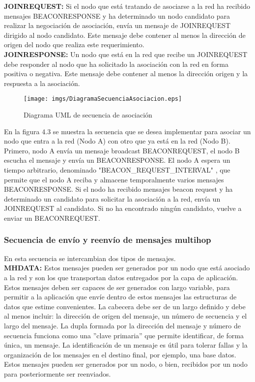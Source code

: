  \textbf{JOIN\textunderscore REQUEST:} Si el nodo que está tratando de asociarse a la red ha recibido mensajes BEACON\textunderscore RESPONSE y ha determinado un nodo candidato para realizar la negociación de asociación, envía un mensaje de JOIN\textunderscore REQUEST dirigido al nodo candidato. Este mensaje debe contener al menos la dirección de origen del nodo que realiza este requerimiento.\\
 
 \textbf{JOIN\textunderscore RESPONSE:} Un nodo que está en la red que recibe un JOIN\textunderscore REQUEST debe responder al nodo que ha solicitado la asociación con la red en forma positiva o negativa. Este mensaje debe contener al menos la dirección origen y la respuesta a la asociación.\\
 
\begin{figure}[H]
 \centering
 \texttt{[image: imgs/DiagramaSecuenciaAsociacion.eps]}
 \caption{Diagrama UML de secuencia de asociación}
\end{figure}

En la figura 4.3 se muestra la secuencia que se desea implementar para asociar un nodo que entra a la red (Nodo A) con otro que ya está en la red (Nodo B). Primero, nodo A envía un mensaje broadcast BEACON\textunderscore REQUEST, el nodo B escucha el mensaje y envía un BEACON\textunderscore RESPONSE. El nodo A espera un tiempo arbitrario, denominado "BEACON\_REQUEST\_INTERVAL" , que permite que el nodo A reciba y almacene temporalmente varios mensajes BEACON\textunderscore RESPONSE. Si el nodo ha recibido mensajes beacon request y ha determinado un candidato para solicitar la asociación a la red, envía un JOIN\textunderscore REQUEST al candidato. Si no ha encontrado ningún candidato, vuelve a enviar un BEACON\textunderscore REQUEST.

\subsubsection{Secuencia de envío y reenvío de mensajes multihop}
En esta secuencia se intercambian dos tipos de mensajes.\\

\textbf{MH\textunderscore DATA:} Estos mensajes pueden ser generados por un nodo que está asociado a la red y son los que transportan datos entregados por la capa de aplicación. Estos mensajes deben ser capaces de ser generados con largo variable, para permitir a la aplicación que envíe dentro de estos mensajes las estructuras de datos que estime convenientes. La cabecera debe ser de un largo definido y debe al menos incluir: la dirección de origen del mensaje, un número de secuencia y el largo del mensaje. La dupla formada por la dirección del mensaje y número de secuencia funciona como una ''clave primaria'' que permite identificar, de forma única, un mensaje. La identificación de un mensaje es útil para tolerar fallas y la organización de los mensajes en el destino final, por ejemplo, una base datos. Estos mensajes pueden ser generados por un nodo, o bien, recibidos por un nodo para posteriormente ser reenviados.\\

